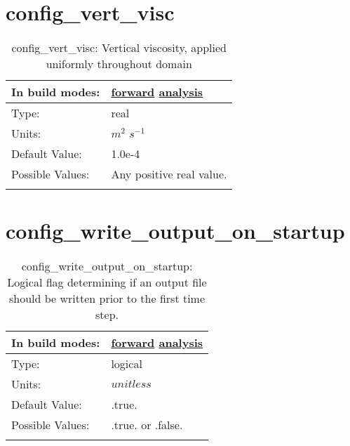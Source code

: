 \section[config\_vert\_visc]{config\_vert\_visc}
\label{sec:nm_sec_config_vert_visc}
\begin{center}
\begin{longtable}{| p{2.0in} || p{4.0in} |}
    \hline
    In build modes: & \hyperref[subsec:forward_nm_tab_vmix_const]{forward} \hyperref[subsec:analysis_nm_tab_vmix_const]{analysis} \\
    \hline
    Type: & real \\
    \hline
    Units: & $m^2$ $s^{-1}$ \\
    \hline
    Default Value: & 1.0e-4 \\
    \hline
    Possible Values: & Any positive real value. \\
    \hline
    \caption{config\_vert\_visc: Vertical viscosity, applied uniformly throughout domain}
\end{longtable}
\end{center}
\section[config\_write\_output\_on\_startup]{config\_write\_output\_on\_startup}
\label{sec:nm_sec_config_write_output_on_startup}
\begin{center}
\begin{longtable}{| p{2.0in} || p{4.0in} |}
    \hline
    In build modes: & \hyperref[subsec:forward_nm_tab_io]{forward} \hyperref[subsec:analysis_nm_tab_io]{analysis} \\
    \hline
    Type: & logical \\
    \hline
    Units: & $unitless$ \\
    \hline
    Default Value: & .true. \\
    \hline
    Possible Values: & .true. or .false. \\
    \hline
    \caption{config\_write\_output\_on\_startup: Logical flag determining if an output file should be written prior to the first time step.}
\end{longtable}
\end{center}
